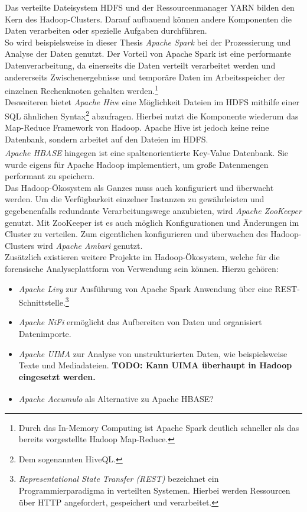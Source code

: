 \noindent
Das verteilte Dateisystem HDFS und der Ressourcenmanager YARN bilden den Kern des Hadoop-Clusters. Darauf aufbauend können andere Komponenten die Daten verarbeiten oder spezielle Aufgaben durchführen.\\
So wird beispielsweise in dieser Thesis \textit{Apache Spark\texttrademark\thinspace} bei der Prozessierung und Analyse der Daten genutzt. Der Vorteil von Apache Spark ist eine performante Datenverarbeitung, da einerseits die Daten verteilt verarbeitet werden und andererseits Zwischenergebnisse und temporäre Daten im Arbeitsspeicher der einzelnen Rechenknoten gehalten werden.\footnote{Durch das In-Memory Computing ist Apache Spark deutlich schneller als das bereits vorgestellte Hadoop Map-Reduce.}\\
Desweiteren bietet \textit{Apache Hive\texttrademark\thinspace} eine Möglichkeit Dateien im HDFS mithilfe einer SQL ähnlichen Syntax\footnote{Dem sogenannten HiveQL.} abzufragen. Hierbei nutzt die Komponente wiederum das Map-Reduce Framework von Hadoop. Apache Hive ist jedoch keine reine Datenbank, sondern arbeitet auf den Dateien im HDFS.\\
\textit{Apache HBASE\textsuperscript{\textregistered}} hingegen ist eine spaltenorientierte Key-Value Datenbank. Sie wurde eigens für Apache Hadoop implementiert, 
um große Datenmengen performant zu speichern.\\

\noindent
Das Hadoop-Ökosystem als Ganzes muss auch konfiguriert und überwacht werden. Um die Verfügbarkeit einzelner Instanzen zu gewährleisten und gegebenenfalls redundante Verarbeitungswege anzubieten, wird \textit{Apache ZooKeeper\texttrademark\thinspace} genutzt. Mit ZooKeeper ist es auch möglich Konfigurationen und Änderungen im Cluster zu verteilen. Zum eigentlichen konfigurieren und überwachen des Hadoop-Clusters wird \textit{Apache Ambari\texttrademark\thinspace} genutzt.\\

\noindent
Zusätzlich existieren weitere Projekte im Hadoop-Ökosystem, welche für die forensische Analyseplattform von Verwendung sein können.
Hierzu gehören:
\begin{itemize}
\item \textit{Apache Livy} zur Ausführung von Apache Spark Anwendung über eine REST-Schnittstelle.\footnote{\textit{Representational State Transfer (REST)} bezeichnet ein Programmierparadigma in verteilten Systemen. Hierbei werden Ressourcen über HTTP angefordert, gespeichert und verarbeitet.}
\item \textit{Apache NiFi} ermöglicht das Aufbereiten von Daten und organisiert Datenimporte.
\item \textit{Apache UIMA\texttrademark\thinspace} zur Analyse von unstrukturierten Daten, wie beispielsweise Texte und Mediadateien. \textbf{TODO: Kann UIMA überhaupt in Hadoop eingesetzt werden.}
\item \textit{Apache Accumulo\textsuperscript{\textregistered}} als Alternative zu Apache HBASE?
\end{itemize} 

